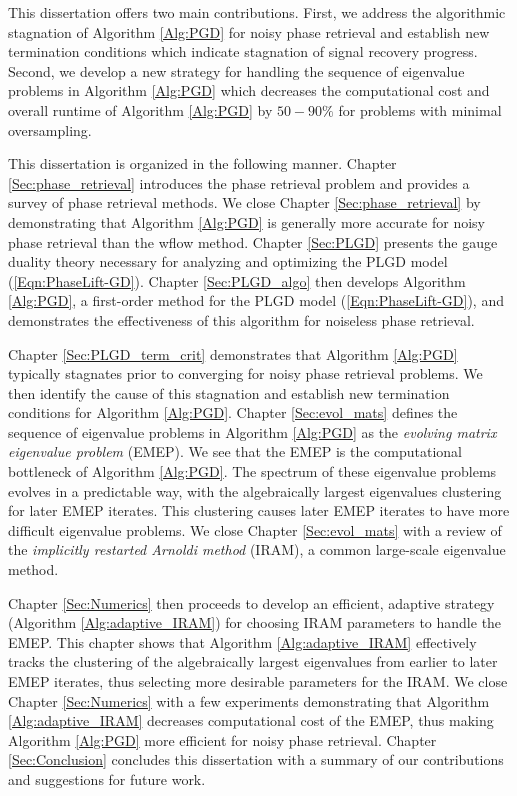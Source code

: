 This dissertation offers two main contributions.  
First, we address the algorithmic stagnation of Algorithm \ref{Alg:PGD} for noisy phase retrieval and establish new termination conditions which indicate stagnation of signal recovery progress.  
Second, we develop a new strategy for handling the sequence of eigenvalue problems in Algorithm \ref{Alg:PGD} which decreases the computational cost and overall runtime of Algorithm \ref{Alg:PGD} by $50-90\%$ for problems with minimal oversampling.


This dissertation is organized in the following manner.  
Chapter \ref{Sec:phase_retrieval} introduces the phase retrieval problem and provides a survey of phase retrieval methods.  
We close Chapter \ref{Sec:phase_retrieval} by demonstrating that Algorithm \ref{Alg:PGD} is generally more accurate for noisy phase retrieval than the wflow method.
Chapter \ref{Sec:PLGD} presents the gauge duality theory necessary for analyzing and optimizing the PLGD model (\ref{Eqn:PhaseLift-GD}).
Chapter \ref{Sec:PLGD_algo} then develops Algorithm \ref{Alg:PGD}, a first-order method for the PLGD model (\ref{Eqn:PhaseLift-GD}), and demonstrates the effectiveness of this algorithm for noiseless phase retrieval.

Chapter \ref{Sec:PLGD_term_crit} demonstrates that Algorithm \ref{Alg:PGD} typically stagnates prior to converging for noisy phase retrieval problems. 
We then identify the cause of this stagnation and establish new termination conditions for Algorithm \ref{Alg:PGD}.
Chapter \ref{Sec:evol_mats} defines the sequence of eigenvalue problems in Algorithm \ref{Alg:PGD} as the \textit{evolving matrix eigenvalue problem} (EMEP).
We see that the EMEP is the computational bottleneck of Algorithm \ref{Alg:PGD}.
The spectrum of these eigenvalue problems evolves in a predictable way, with the algebraically largest eigenvalues clustering for later EMEP iterates.
This clustering causes later EMEP iterates to have more difficult eigenvalue problems.
We close Chapter \ref{Sec:evol_mats} with a review of the \textit{implicitly restarted Arnoldi method} (IRAM), a common large-scale eigenvalue method.

Chapter \ref{Sec:Numerics} then proceeds to develop an efficient, adaptive strategy (Algorithm \ref{Alg:adaptive_IRAM}) for choosing IRAM parameters to handle the EMEP.
This chapter shows that Algorithm \ref{Alg:adaptive_IRAM} effectively tracks the clustering of the algebraically largest eigenvalues from earlier to later EMEP iterates, thus selecting more desirable parameters for the IRAM.
We close Chapter \ref{Sec:Numerics} with a few experiments demonstrating that Algorithm \ref{Alg:adaptive_IRAM} decreases computational cost of the EMEP, thus making Algorithm \ref{Alg:PGD} more efficient for noisy phase retrieval.
Chapter \ref{Sec:Conclusion} concludes this dissertation with a summary of our contributions and suggestions for future work.




